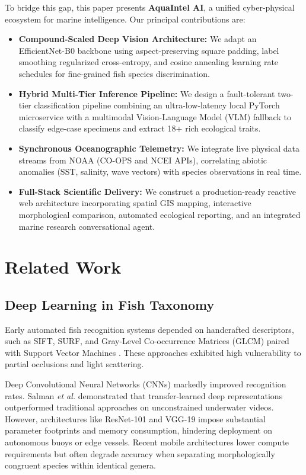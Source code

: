 \documentclass[conference]{IEEEtran}
\begin{document}
To bridge this gap, this paper presents \textbf{AquaIntel AI}, a unified cyber-physical ecosystem for marine intelligence. Our principal contributions are:
\begin{itemize}
    \item \textbf{Compound-Scaled Deep Vision Architecture:} We adapt an EfficientNet-B0 backbone using aspect-preserving square padding, label smoothing regularized cross-entropy, and cosine annealing learning rate schedules for fine-grained fish species discrimination.
    \item \textbf{Hybrid Multi-Tier Inference Pipeline:} We design a fault-tolerant two-tier classification pipeline combining an ultra-low-latency local PyTorch microservice with a multimodal Vision-Language Model (VLM) fallback to classify edge-case specimens and extract 18+ rich ecological traits.
    \item \textbf{Synchronous Oceanographic Telemetry:} We integrate live physical data streams from NOAA (CO-OPS and NCEI APIs), correlating abiotic anomalies (SST, salinity, wave vectors) with species observations in real time.
    \item \textbf{Full-Stack Scientific Delivery:} We construct a production-ready reactive web architecture incorporating spatial GIS mapping, interactive morphological comparison, automated ecological reporting, and an integrated marine research conversational agent.
\end{itemize}

\section{Related Work}
\subsection{Deep Learning in Fish Taxonomy}
Early automated fish recognition systems depended on handcrafted descriptors, such as SIFT, SURF, and Gray-Level Co-occurrence Matrices (GLCM) paired with Support Vector Machines \cite{spampinato2008}. These approaches exhibited high vulnerability to partial occlusions and light scattering. 

Deep Convolutional Neural Networks (CNNs) markedly improved recognition rates. Salman \textit{et al.} \cite{salman2020} demonstrated that transfer-learned deep representations outperformed traditional approaches on unconstrained underwater videos. However, architectures like ResNet-101 and VGG-19 impose substantial parameter footprints and memory consumption, hindering deployment on autonomous buoys or edge vessels. Recent mobile architectures \cite{howard2017} lower compute requirements but often degrade accuracy when separating morphologically congruent species within identical genera.
\end{document}
